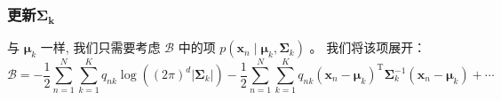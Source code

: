 \documentclass[UTF8]{ctexart}
\begin{document}
\subsubsection{更新$\boldsymbol{\Sigma_k}$}
与 $\boldsymbol{\mu}_{k}$ 一样, 
我们只需要考虑 $\mathcal{B}$ 中的项 
$p\left(\boldsymbol{x}_{n} \mid \boldsymbol{\mu}_{k}, \boldsymbol{\Sigma}_{k}\right)$ 。
我们将该项展开：
\begin{equation}
    \mathcal{B}=-\frac{1}{2} \sum_{n=1}^{N} \sum_{k=1}^{K} q_{n k} \log \left((2 \pi)^{d}\left|\boldsymbol{\Sigma}_{k}\right|\right)-\frac{1}{2} \sum_{n=1}^{N} \sum_{k=1}^{K} q_{n k}\left(\boldsymbol{x}_{n}-\boldsymbol{\mu}_{k}\right)^{\mathrm{T}} \boldsymbol{\Sigma}_{k}^{-1}\left(\boldsymbol{x}_{n}-\boldsymbol{\mu}_{k}\right)+\cdots 
\end{equation}
\end{document}
